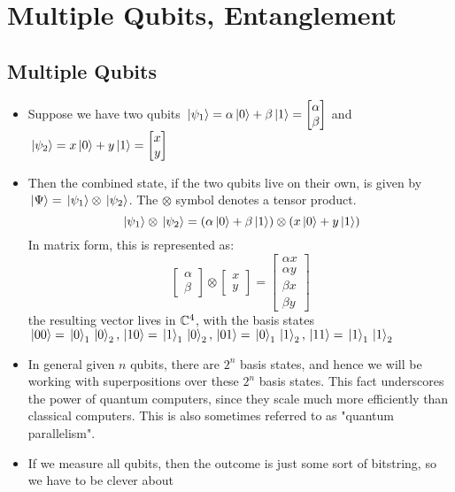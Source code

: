 \section{Multiple Qubits, Entanglement}
\subsection{Multiple Qubits}
\begin{itemize}
	\item Suppose we have two qubits \( \ket*{\psi_1} = \alpha\ket*{0} + \beta \ket*{1} = 
		\begin{bmatrix} \alpha\\ \beta \end{bmatrix}  \) and \( \ket*{\psi_2} = x\ket*{0} + y\ket*{1} = 
		\begin{bmatrix} x\\y \end{bmatrix}  \)
	\item Then the combined state, if the two qubits live on their own, is given by \( \ket*{\Psi} = \ket*{\psi_1} 
		\otimes \ket*{\psi_2} \). The \( \otimes \) symbol denotes a tensor product.
		\[
		\ket*{\psi_1} \otimes \ket*{\psi_2} = (\alpha \ket*{0} + \beta \ket*{1}) \otimes (x \ket*{0} + y \ket*{1})
		\] 
		In matrix form, this is represented as: 
		\[
		\begin{bmatrix} \alpha\\ \beta \end{bmatrix} \otimes \begin{bmatrix} x\\y \end{bmatrix} = 
		\begin{bmatrix} \alpha x\\ \alpha y\\\beta x\\\beta y\end{bmatrix} 
		\] 
		the resulting vector lives in \( \mathbb C^{4} \), with the basis states \( \ket*{00} = \ket*{0}_1 \ket*{0}_2, 
		\ket*{10} = \ket*{1}_1 \ket*{0}_2, \ket*{01} = \ket*{0}_1 \ket*{1}_2, \ket*{11} = \ket*{1}_1 \ket*{1}_2\)
	\item In general given \( n \) qubits, there are \( 2^{n} \) basis states, and hence we will be working with 
		superpositions over these \( 2^{n} \) basis states. This fact underscores the power of quantum computers, 
		since they scale much more efficiently than classical computers. This is also sometimes referred to as 
		"quantum parallelism". 
	\item If we measure all qubits, then the outcome is just some sort of bitstring, so we have to be clever about 

\end{itemize}
